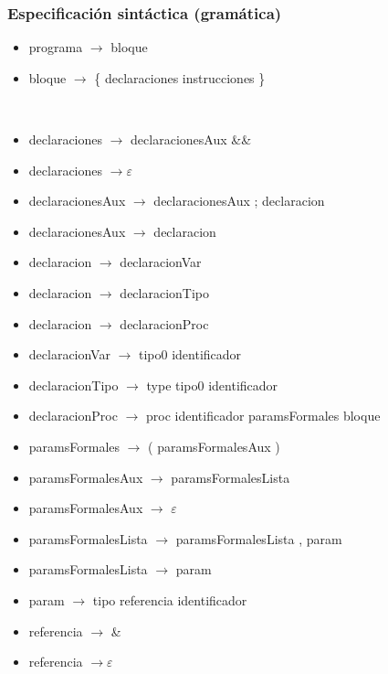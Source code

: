 \documentclass[11pt]{article}
\begin{document}
        \subsubsection{Especificación sintáctica (gramática)}
        \begin{itemize}
            \item programa $\rightarrow$ bloque
            \item bloque $\rightarrow$ \{ declaraciones instrucciones \}
        \end{itemize}
        \
        \begin{itemize}
            \item declaraciones $\rightarrow$ declaracionesAux \&\&
            \item declaraciones $\rightarrow \varepsilon$
            \item declaracionesAux $\rightarrow$ declaracionesAux ; declaracion
            \item declaracionesAux $\rightarrow$ declaracion
            \item declaracion $\rightarrow$ declaracionVar
            \item declaracion $\rightarrow$ declaracionTipo
            \item declaracion $\rightarrow$ declaracionProc
            \item declaracionVar $\rightarrow$ tipo0 identificador
            \item declaracionTipo $\rightarrow$ type tipo0 identificador
            \item declaracionProc $\rightarrow$ proc identificador paramsFormales bloque
            \item paramsFormales $\rightarrow$ ( paramsFormalesAux )
            \item paramsFormalesAux $\rightarrow$ paramsFormalesLista
            \item paramsFormalesAux $\rightarrow$ $\varepsilon$
            \item paramsFormalesLista $\rightarrow$ paramsFormalesLista , param 
            \item paramsFormalesLista $\rightarrow$ param
            \item param $\rightarrow$ tipo referencia identificador
            \item referencia $\rightarrow$ \&
            \item referencia $\rightarrow \varepsilon$
        \end{itemize}
        \
\end{document}

